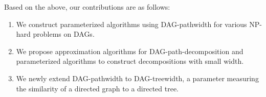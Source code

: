 \documentclass[runningheads]{llncs}
\theoremstyle{plain}
\theoremstyle{definition}
\begin{document}


Based on the above, our contributions are as follows:  
\begin{enumerate}
    \item We construct parameterized algorithms using DAG-pathwidth for various NP-hard problems on DAGs.  
    \item We propose approximation algorithms for DAG-path-decomposition and parameterized algorithms to construct decompositions with small width.  
    \item We newly extend DAG-pathwidth to DAG-treewidth, a parameter measuring the similarity of a directed graph to a directed tree.  
\end{enumerate}
\end{document}
